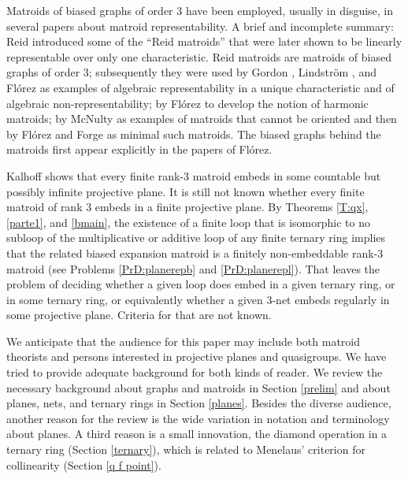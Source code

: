 \documentclass[reqno,12pt]{amsart}
\theoremstyle{remark}
\numberwithin{equation}{section}
\numberwithin{figure}{section}
\begin{document}
Matroids of biased graphs of order 3 have been employed, usually in disguise, in several papers about matroid representability.  A brief and incomplete summary:  Reid \cite{Reid} introduced some of the ``Reid matroids'' \cite{Oxley} that were later shown to be linearly representable over only one characteristic.  Reid matroids are matroids of biased graphs of order 3; subsequently they were used by Gordon \cite{Galg}, Lindstr\"om \cite{LindAlg}, and Fl\'orez \cite{FLind} as examples of algebraic representability in a unique characteristic and of algebraic non-representability;  
by Fl\'orez \cite{FHarm} to develop the notion of harmonic matroids; by 
McNulty \cite{McN, McNnon} as examples of matroids that cannot be oriented and then by Fl\'orez and Forge \cite{FF} as minimal such matroids.  The biased graphs behind the matroids first appear explicitly in the papers of Fl\'orez.

Kalhoff \cite{K} shows that every finite rank-3 matroid embeds in some countable but possibly infinite projective plane.
It is still not known whether every finite matroid of rank 3 embeds in a finite projective plane.  By Theorems \ref{T:qx}, \ref{parte1}, and \ref{bmain}, the existence of a finite loop that is isomorphic to no subloop of the multiplicative or additive loop of any finite ternary ring implies that the related biased expansion matroid is a finitely non-embeddable rank-3 matroid (see Problems \ref{PrD:planerepb} and \ref{PrD:planerepl}).  
That leaves the problem of deciding whether a given loop does embed in a given ternary ring, or in some ternary ring, or equivalently whether a given $3$-net embeds regularly in some projective plane.  Criteria for that are not known.

We anticipate that the audience for this paper may include both matroid theorists and persons interested in projective planes and quasigroups.  We have tried to provide adequate background for both kinds of reader.  
We review the necessary background about graphs and matroids in Section \ref{prelim} and about planes, nets,  and ternary rings in Section \ref{planes}.  Besides the diverse audience, another reason for the review is the wide variation in notation and terminology about planes.  A third reason is a small innovation, the diamond operation in a ternary ring (Section \ref{ternary}), which is related to Menelaus' criterion for collinearity (Section \ref{q f point}).



\end{document}
